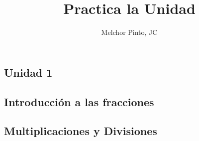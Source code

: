 \documentclass[12pt,addpoints,answers]{repaso}
\title{Practica la Unidad}
\author{Melchor Pinto, JC}
\begin{document}
\INFO
\begin{multicols}{2}
	\tableofcontents
\end{multicols}\newpage
\begin{questions}\large
	\section*{Unidad 1}
	\subsection*{Introducción a las fracciones}
	
	\questionboxed[10]{

	}


	\subsection*{Multiplicaciones y Divisiones}


\end{questions}
\end{document}
